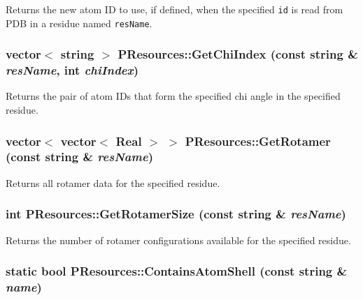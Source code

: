 Returns the new atom ID to use, if defined, when the specified {\tt id} is read from PDB in a residue named {\tt res\-Name}. 
\subsubsection{\setlength{\rightskip}{0pt plus 5cm}vector$<$ string $>$ PResources::Get\-Chi\-Index (const string \& {\em res\-Name}, int {\em chi\-Index})\hspace{0.3cm}{\tt  [static]}}\label{classPResources_957cec6559d02461055ef51cc41e76a1}


Returns the pair of atom IDs that form the specified chi angle in the specified residue. 
\subsubsection{\setlength{\rightskip}{0pt plus 5cm}vector$<$ vector$<$ Real $>$ $>$ PResources::Get\-Rotamer (const string \& {\em res\-Name})\hspace{0.3cm}{\tt  [static]}}\label{classPResources_2a679399799819e8e68c698153a6659a}


Returns all rotamer data for the specified residue. 
\subsubsection{\setlength{\rightskip}{0pt plus 5cm}int PResources::Get\-Rotamer\-Size (const string \& {\em res\-Name})\hspace{0.3cm}{\tt  [static]}}\label{classPResources_0510c19a3d7cb2568478b4260a1581a6}


Returns the number of rotamer configurations available for the specified residue. 
\subsubsection{\setlength{\rightskip}{0pt plus 5cm}static bool PResources::Contains\-Atom\-Shell (const string \& {\em name})\hspace{0.3cm}{\tt  [inline, static]}}\label{classPResources_5a493fbf383c6ae8bdf63e068241e116}


